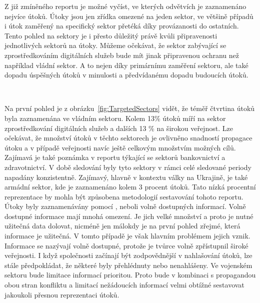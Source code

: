 Z již zmíněného reportu\cite{Enisa_thread_landscape} je možné vyčíst, ve kterých odvětvích je zaznamenáno nejvíce útoků.
Útoky jsou jen zřídka omezené na jeden sektor, ve většině případů i útok zaměřený na specifický sektor přetéká díky provázanosti do ostatních.
Tento pohled na sektory je i přesto důležitý právě kvůli připravenosti jednotlivých sektorů na útoky.
Můžeme očekávat, že sektor zabývající se zprostředkováním digitálních služeb bude mít jinak připravenou ochranu než například vládní sektor.
A to nejen díky primárnímu zaměření sektoru, ale také dopadu úspěšných útoků v minulosti a předvídanému dopadu budoucích útoků.

~

Na první pohled je z obrázku~\ref{fig:TargetedSectors} vidět, že téměř čtvrtina útoků byla zaznamenána ve vládním sektoru.
Kolem 13\% útoků míří na sektor zprostředkování digitálních služeb a dalších 13 \% na širokou veřejnost.
Lze očekávat, že množství útoků v těchto sektorech je ovlivněno snadností propagace útoku a v případě veřejnosti navíc ještě celkovým množstvím možných cílů.
Zajímavá je také poznámka v reportu týkající se sektorů bankovnictví a zdravotnictví.
V době sledování byly tyto sektory v rámci celé sledované periody napadány konzistentně.
Zajímavý, hlavně v kontextu války na Ukrajině, je také armádní sektor, kde je zaznamenáno kolem 3 procent útoků.
Tato nízká procentní reprezentace by mohla být způsobena metodologií sestavování tohoto reportu.
Útoky byly zaznamenávány pomocí , neboli volně dostupných informací\cite{moje_bakalarka}.
Volně dostupné informace mají mnohá omezení.
Je jich velké množství a proto je nutné užitečná data dolovat, nicméně jen málokdy je na první pohled zřejmé, která informace je užitečná.
V tomto případě je však hlavním problémem jejich vznik.
Informace se nazývají volně dostupné, protože je tvůrce volně zpřístupnil široké veřejnosti.
I když společnosti začínají být zodpovědnější v nahlašování útoků, lze stále předpokládat, že některé byly přehlédnuty nebo nenahlášeny.
Ve vojenském sektoru bude limitace informací prioritou.
Proto bude v kombinaci s propagandou obou stran konfliktu a limitací nežádoucích informací velmi obtížné sestavovat jakoukoli přesnou reprezentaci útoků.

